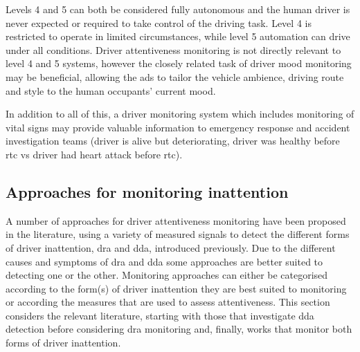 \documentclass[11pt, parskip=half*,twoside=false]{scrbook}
\begin{document}
Levels 4 and 5 can both be considered fully autonomous and the human driver is never expected or required to take control of the driving task. Level 4 is restricted to operate in limited circumstances, while level 5 automation can drive under all conditions. Driver attentiveness monitoring is not directly relevant to level 4 and 5 systems, however the closely related task of driver mood monitoring may be beneficial, allowing the \gls{ads} to tailor the vehicle ambience, driving route and style to the human occupants' current mood.

In addition to all of this, a driver monitoring system which includes monitoring of vital signs may provide valuable information to emergency response and accident investigation teams (driver is alive but deteriorating, driver was healthy before \gls{rtc} vs driver had heart attack before \gls{rtc}). 

\subsection{Approaches for monitoring inattention} \label{ssec:approaches}
A number of approaches for driver attentiveness monitoring have been proposed in the literature, using a variety of measured signals to detect the different forms of driver inattention, \gls{dra} and \gls{dda}, introduced previously. Due to the different causes and symptoms of \gls{dra} and \gls{dda} some approaches are better suited to detecting one or the other. Monitoring approaches can either be categorised according to the form(s) of driver inattention they are best suited to monitoring or according the measures that are used to assess attentiveness. This section considers the relevant literature, starting with those that investigate \gls{dda} detection before considering \gls{dra} monitoring and, finally, works that monitor both forms of driver inattention. 
\end{document}

